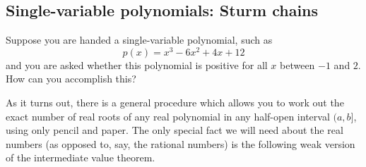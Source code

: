 \begin{comment}
\begin{exer} Show that the dual of the dual is the primal.
\end{exer}

\begin{exer} Show that we only need either the primal or the dual to be
  feasible for strong duality to hold. More precisely, if the primal
  is feasible but the dual is infeasible, prove that the primal will
  be unbounded, implying that $z^*=w^*=+\infty$.
\end{exer}

Looking at $c^Tx=y^TAx\leq b^Ty$, we observe that to get equality
between $c^Tx$ and $b^Ty$, we need {\it complementary slackness}:

\begin{thm}[Complementary Slackness]
If $x$ is feasible in $(P)$ and $y$ is feasible in $(D)$ then $x$ is
optimum in $(P)$ and $y$ is optimum in $(D)$ if and only if for all
$i$ either $y_i=0$ or $\sum_j a_{ij} x_j =b_i$ (or both). 
\end{thm}
\end{comment}


\subsection{Single-variable polynomials: Sturm chains}

Suppose you are handed a single-variable polynomial, such as
\[
p(x) = x^3 - 6x^2 + 4x + 12
\]
and you are asked whether this polynomial is positive for all $x$ between $-1$ and $2$. How can you accomplish this?

As it turns out, there is a general procedure which allows you to work out the exact number of real roots of any real polynomial in any half-open interval $(a,b]$, using only pencil and paper. The only special fact we will need about the real numbers (as opposed to, say, the rational numbers) is the following weak version of the intermediate value theorem.

